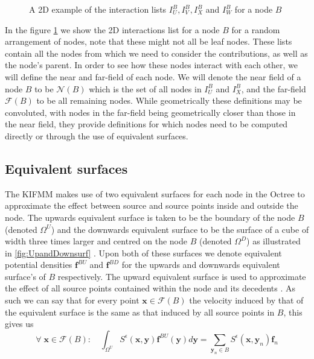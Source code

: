 \begin{figure}[ht]
    \centering
    \resizebox{.3\linewidth}{!}{}
    \caption{A 2D example of the interaction lists $I_U^B, I_V^B, I_X^B$ and $I_W^B$ for a node $B$}
    \label{fig:InteractionsLists}
\end{figure}


In the figure \ref{fig:InteractionsLists} we show the 2D interactions list for a node $B$ for a random arrangement of nodes, note that these might not all be leaf nodes. These lists contain all the nodes from which we need to consider the contributions, as well as the node's parent. In order to see how these nodes interact with each other, we will define the near and far-field of each node. We will denote the near field of a node $B$ to be $\mathcal{N}(B)$ which is the set of all nodes in $I_U^B$ and $I_X^B$, and the far-field $\mathcal{F}(B)$ to be all remaining nodes. While geometrically these definitions may be convoluted, with nodes in the far-field being geometrically closer than those in the near field, they provide definitions for which nodes need to be computed directly or through the use of equivalent surfaces.

\subsection{Equivalent surfaces}

The KIFMM makes use of two equivalent surfaces for each node in the Octree to approximate the effect between source and source points inside and outside the node. The upwards equivalent surface is taken to be the boundary of the node $B$ (denoted $\Omega^U$) and the downwards equivalent surface to be the surface of a cube of width three times larger and centred on the node $B$ (denoted $\Omega^D$) as illustrated in \cref{fig:UpandDownsurf} \cite{Ying2004}. Upon both of these surfaces we denote equivalent potential densities $\bm{f}^{BU}$ and $\bm{f}^{BD}$ for the upwards and downwards equivalent surface's of $B$ respectively. The upward equivalent surface is used to approximate the effect of all source points contained within the node and its decedents \cite{Rostami2016Kernel-independentStokeslets,Yan}. As such we can say that for every point $\bm{x}\in\mathcal{F}(B)$ the velocity induced by that of the equivalent surface is the same as that induced by all source points in $B$, this gives us
\begin{equation}
\label{eq:upsurfint}
    \forall \;\bm{x} \in \mathcal{F}(B): \quad \int_{\Omega^U} S^\epsilon(\bm{x}, \bm{y}) \bm{f}^{BU}(\bm{y}) d \bm{y}=\sum_{{\bm{y}}_n \in B} S^\epsilon\left(\bm{x}, {\bm{y}}_n\right) {\bm{f}}_{n}
\end{equation}

